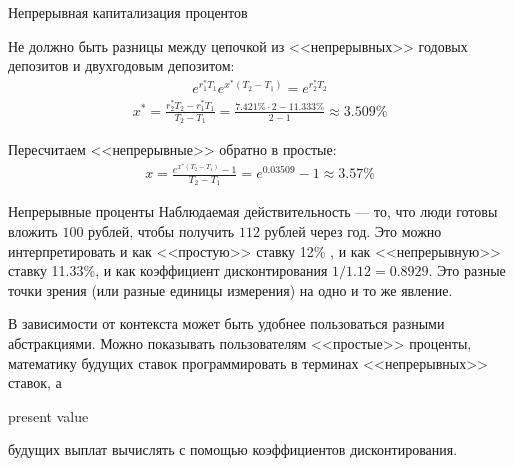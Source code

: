 \documentclass{beamer}
\newcommand{\en}[1]{\begin{otherlanguage}{english}#1\end{otherlanguage}}
\begin{document}
\begin{frame}{Непрерывная капитализация процентов}
\centering
{}

\justifying
Не должно быть разницы между цепочкой из <<непрерывных>> годовых депозитов и двухгодовым депозитом:
\begin{align*}
e^{r_1^*T_1}e^{x^*(T_2-T_1)} = e^{r_2^*T_2}
\end{align*}
\begin{align*}
x^* = \frac{r_2^*T_2-r_1^*T_1}{T_2-T_1} = \frac{7.421\%\cdot2 - 11.333\%}{2 - 1} \approx 3.509\%
\end{align*}

Пересчитаем <<непрерывные>> обратно в простые:
\begin{align*}
x = \frac{e^{x^*(T_2-T_1)} - 1}{T_2 - T_1} = e^{0.03509} - 1 \approx 3.57\% 
\end{align*}
\end{frame}



\begin{frame}{Непрерывные проценты}
\justify
Наблюдаемая действительность --- то, что люди готовы вложить $100$ рублей, чтобы получить $112$ рублей через год. Это можно интерпретировать и как <<простую>> ставку 12\% , и как <<непрерывную>> ставку 11.33\%, и как коэффициент дисконтирования $1/1.12 = 0.8929$. Это разные точки зрения (или разные единицы измерения) на одно и то же явление.

\justify 
В зависимости от контекста может быть удобнее пользоваться разными абстракциями. Можно показывать пользователям <<простые>> проценты, математику будущих ставок программировать в терминах <<непрерывных>> ставок, а \en{present value} будущих выплат вычислять с помощью коэффициентов дисконтирования.
\end{frame}
\end{document}
